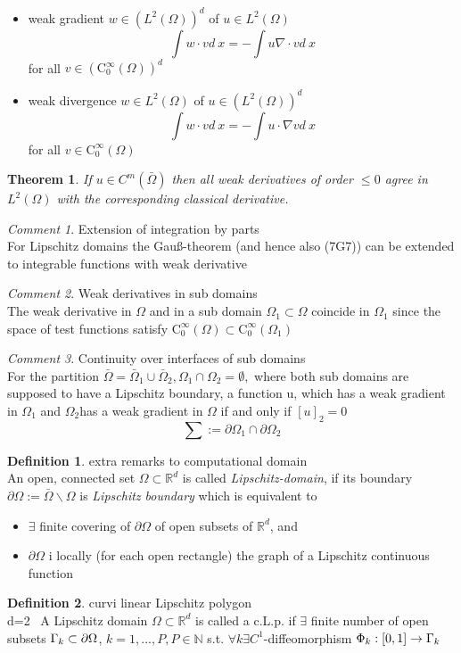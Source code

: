 \documentclass[english]{article}
\newtheorem*{theorem}{Theorem}
\theoremstyle{definition}
\newtheorem*{defi}{Definition}
\theoremstyle{remark}
\newtheorem*{comm}{Comment}
\newcommand{\p}{\partial}
\newcommand{\NN}{\mathbb{N}}			%
\newcommand{\RR}{\mathbb{R}}			%
\newcommand{\OO}{\Omega}
\newcommand{\cinf}{\tx{C}^\infty}
\newcommand{\tx}[1]{\text{#1}}
\begin{document}
\begin{itemize}
\item weak gradient $w \in (L^2(\OO))^d$ of $u \in L^2(\OO)$
  $$\int w\cdot v d\ x = -\int u \nabla \cdot v d\ x$$
  for all $v \in (\cinf_0 (\OO))^d$
\item weak divergence $w\in L^2(\OO)$ of $u \in (L^2(\OO))^d$
  $$\int w\cdot v d\ x = -\int u \cdot\nabla  v d\ x$$
  for all $v \in \cinf_0(\OO)$
\end{itemize}
\begin{theorem}
  If $u \in C^m(\bar\OO)$ then all weak derivatives of order $\leq 0$ agree in $L^2(\OO)$ with the corresponding classical derivative.
\end{theorem}
\begin{comm}Extension of integration by parts\\

  For Lipschitz domains the Gau\ss{}-theorem (and hence also (7G7)) can be extended to integrable functions with weak derivative
\end{comm}
\begin{comm} Weak derivatives in sub domains\\
  The weak derivative in $\OO$ and in a sub domain $\OO_1 \subset \OO$ coincide in $\OO_1$ since the space of test functions satisfy $\cinf_0(\OO) \subset \cinf_0(\OO_1)$
\end{comm}
\begin{comm} Continuity over interfaces of sub domains\\
  For the partition $\bar\OO = \bar\OO_1 \cup \bar\OO_2, \OO_1\cap\OO_2=\emptyset,$ where both sub domains are supposed to have a Lipschitz boundary, a function u, which has a weak gradient in $\OO_1$ and $\OO_2$has a weak gradient in $\OO$ if and only if $[u]_2 = 0$ $$\sum:= \p \OO_1 \cap\p \OO_2$$
\end{comm}
\begin{defi} extra remarks to computational domain\\
  An open, connected set $\OO \subset \RR^d $ is called \emph{Lipschitz-domain}, if its boundary $\p\OO:=\bar\OO\backslash \OO$ is \emph{Lipschitz boundary} which is equivalent to 
  \begin{itemize}
  \item $\exists$ finite covering of $\p\OO$ of open subsets of $\RR^d$, and 
  \item $\p \OO$ i locally (for each open rectangle) the graph of a Lipschitz continuous function
  \end{itemize}
\end{defi}
\begin{defi}
  curvi linear Lipschitz polygon\\
  d=2 \ A Lipschitz domain $\OO\subset \RR^d$ is called a c.L.p. if $\exists $ finite number of open subsets $\GG_k \subset \p \OO$, $k=1,...,P, P\in \NN$ s.t. $\forall k \exists C^1$-diffeomorphism $\Phi_k : [0,1] \to \Gamma_k$

\end{defi}
\end{document}
